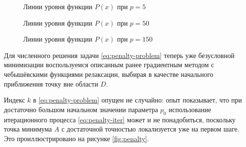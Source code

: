 \begin{figure}[!thb]
  \centering
  \caption{Линии уровня функции $P(x)$ при $p=5$}
    \label{fig:pen-contours2}
\end{figure}

\begin{figure}[!thb]
  \centering
  \caption{Линии уровня функции $P(x)$ при $p=50$}
  \label{fig:pen-contours3}
\end{figure}

\begin{figure}[!thb]
  \centering
  \caption{Линии уровня функции $P(x)$ при $p=150$}
  \label{fig:pen-contours4}
\end{figure}

Для численного решения задачи \eqref{eq:penalty-problem} теперь уже
безусловной минимизации воспользуемся описанным ранее градиентным
методом с чебышёвскими функциями релаксации, выбирая в качестве
начального приближения точку вне области $D$.

Индекс $k$ в \eqref{eq:penalty-problem} опущен не случайно: опыт
показывает, что при достаточно большом начальном значении параметра
$p_0$ использование итерационного процесса \eqref{eq:penalty-iter}
может и не понадобиться, поскольку точка минимума $A$ с достаточной
точностью локализуется уже на первом шаге. Это проиллюстрировано на
рисунке \ref{fig:penalty}.

